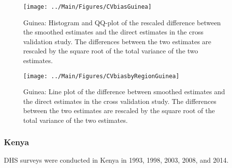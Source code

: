 \documentclass[12pt]{article}\usepackage[]{graphicx}\usepackage[]{color}
\newenvironment{knitrout}{}{} %
\begin{document}
\begin{knitrout}
\color{fgcolor}\begin{figure}[bht]

{\centering \texttt{[image: ../Main/Figures/CVbiasGuinea]} 

}

\caption[Guinea]{Guinea: Histogram and QQ-plot of the rescaled difference between the smoothed estimates and the direct estimates in the cross validation study. The differences between the two estimates are rescaled by the square root of the total variance of the two estimates.}\label{fig:unnamed-chunk-159}
\end{figure}


\end{knitrout}

\begin{knitrout}
\color{fgcolor}\begin{figure}[bht]

{\centering \texttt{[image: ../Main/Figures/CVbiasbyRegionGuinea]} 

}

\caption[Guinea]{Guinea: Line plot of the difference between smoothed estimates and the direct estimates in the cross validation study. The differences between the two estimates are rescaled by the square root of the total variance of the two estimates.}\label{fig:unnamed-chunk-160}
\end{figure}


\end{knitrout}


\clearpage
\subsubsection{Kenya}





DHS surveys were conducted in Kenya in 1993, 1998, 2003, 2008, and 2014.
\end{document}
